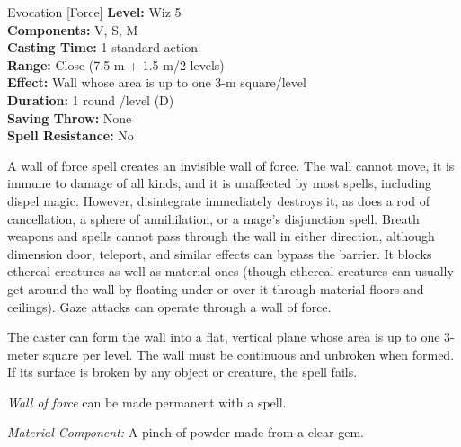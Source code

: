 {Evocation [Force]}
{
	\textbf{Level:}
	Wiz 5\\
	\textbf{Components:}
	V, S, M\\
	\textbf{Casting Time:}
	1 standard action\\
	\textbf{Range:}
	Close (7.5 m + 1.5 m/2 levels)\\
	\textbf{Effect:}
	Wall whose area is up to one 3-m square/level\\
	\textbf{Duration:}
	1 round /level (D)\\
	\textbf{Saving Throw:}
	None\\
	\textbf{Spell Resistance:}
	No\\
}
{
	A wall of force spell creates an invisible wall of force. The wall cannot move, it is immune to damage of all kinds, and it is unaffected by most spells, including dispel magic. However, disintegrate immediately destroys it, as does a rod of cancellation, a sphere of annihilation, or a mage's disjunction spell. Breath weapons and spells cannot pass through the wall in either direction, although dimension door, teleport, and similar effects can bypass the barrier. It blocks ethereal creatures as well as material ones (though ethereal creatures can usually get around the wall by floating under or over it through material floors and ceilings). Gaze attacks can operate through a wall of force.

	The caster can form the wall into a flat, vertical plane whose area is up to one 3-meter square per level. The wall must be continuous and unbroken when formed. If its surface is broken by any object or creature, the spell fails.

	\emph{Wall of force} can be made permanent with a  spell.

	\textit{Material Component:}
	A pinch of powder made from a clear gem.

}
